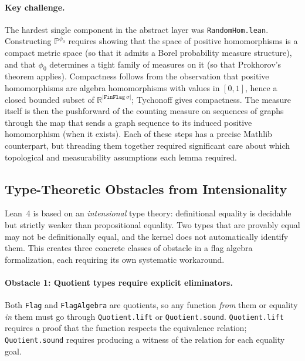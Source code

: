 \documentclass{article}
\newcommand{\lean}[1]{\texttt{#1}}
\begin{document}
\paragraph{Key challenge.}
The hardest single component in the abstract layer was \lean{RandomHom.lean}.
Constructing $\mathbb{P}^{\phi_0}$ requires showing that the space of positive
homomorphisms is a compact metric space (so that it admits a Borel probability
measure structure), and that $\phi_0$ determines a tight family of measures
on it (so that Prokhorov's theorem applies).  Compactness follows from the
observation that positive homomorphisms are algebra homomorphisms with
values in $[0,1]$, hence a closed bounded subset of $\mathbb{R}^{|\lean{FinFlag}\ \sigma|}$;
Tychonoff gives compactness.  The measure itself is then the pushforward of the
counting measure on sequences of graphs through the map that sends a graph
sequence to its induced positive homomorphism (when it exists).  Each of these
steps has a precise Mathlib counterpart, but threading them together required
significant care about which topological and measurability assumptions each
lemma required.


\subsection{Type-Theoretic Obstacles from Intensionality}
\label{sec:intensional}

Lean~4 is based on an \emph{intensional} type theory: definitional equality is
decidable but strictly weaker than propositional equality.  Two types that are
provably equal may not be definitionally equal, and the kernel does not
automatically identify them.  This creates three concrete classes of obstacle
in a flag algebra formalization, each requiring its own systematic workaround.

\paragraph{Obstacle 1: Quotient types require explicit eliminators.}
Both \lean{Flag} and \lean{FlagAlgebra} are quotients, so any function
\emph{from} them or equality \emph{in} them must go through
\lean{Quotient.lift} or \lean{Quotient.sound}.  \lean{Quotient.lift} requires
a proof that the function respects the equivalence relation; \lean{Quotient.sound}
requires producing a witness of the relation for each equality goal.
\end{document}
